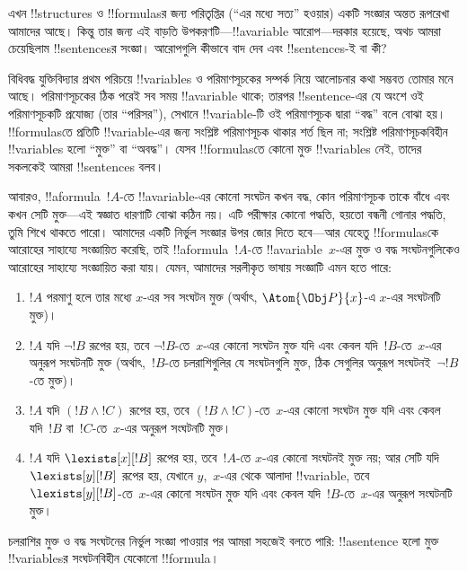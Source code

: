 \documentclass[../../../include/open-logic-section]{subfiles}
\begin{document}


এখন !!{structure}s ও !!{formula}sর জন্য পরিতৃপ্তির (“এর মধ্যে সত্য”
হওয়ার) একটি সংজ্ঞার অন্তত রূপরেখা আমাদের আছে। কিন্তু তার জন্য এই বাড়তি
উপকরণটি—!!a{variable} আরোপ—দরকার হয়েছে, অথচ আমরা চেয়েছিলাম
!!{sentence}sর সংজ্ঞা। আরোপগুলি কীভাবে বাদ দেব এবং !!{sentence}s-ই বা
কী?

বিধিবদ্ধ যুক্তিবিদ্যার প্রথম পরিচয়ে !!{variable}s ও পরিমাণসূচকের সম্পর্ক
নিয়ে আলোচনার কথা সম্ভবত তোমার মনে আছে। পরিমাণসূচকের ঠিক পরেই সব সময়
!!a{variable} থাকে; তারপর !!{sentence}-এর যে অংশে ওই পরিমাণসূচকটি প্রযোজ্য
(তার “পরিসর”), সেখানে !!{variable}-টি ওই পরিমাণসূচক দ্বারা “বদ্ধ” বলে
বোঝা হয়। !!{formula}sতে প্রতিটি !!{variable}-এর জন্য সংশ্লিষ্ট পরিমাণসূচক
থাকার শর্ত ছিল না; সংশ্লিষ্ট পরিমাণসূচকবিহীন !!{variable}s হলো “মুক্ত” বা
“অবদ্ধ”। যেসব !!{formula}sতে কোনো মুক্ত !!{variable}s নেই, তাদের সকলকেই
আমরা !!{sentence}s বলব।

আবারও, !!a{formula}~$!A$-তে !!a{variable}-এর কোনো সংঘটন কখন বদ্ধ, কোন
পরিমাণসূচক তাকে বাঁধে এবং কখন সেটি মুক্ত—এই স্বজ্ঞাত ধারণাটি বোঝা কঠিন
নয়। এটি পরীক্ষার কোনো পদ্ধতি, হয়তো বন্ধনী গোনার পদ্ধতি, তুমি শিখে
থাকতে পারো। আমাদের একটি নির্ভুল সংজ্ঞার উপর জোর দিতে হবে—আর যেহেতু
!!{formula}sকে আরোহের সাহায্যে সংজ্ঞায়িত করেছি, তাই !!a{formula}~$!A$-তে
!!a{variable}~$x$-এর মুক্ত ও বদ্ধ সংঘটনগুলিকেও আরোহের সাহায্যে সংজ্ঞায়িত
করা যায়। যেমন, আমাদের সরলীকৃত ভাষায় সংজ্ঞাটি এমন হতে পারে:
\begin{enumerate}
  \item $!A$ পরমাণু হলে তার মধ্যে $x$-এর সব সংঘটন মুক্ত (অর্থাৎ,
  $\Atom{\Obj P}{x}$-এ $x$-এর সংঘটনটি মুক্ত)।
  \item $!A$ যদি $\lnot !B$ রূপের হয়, তবে $\lnot !B$-তে~$x$-এর কোনো
  সংঘটন মুক্ত যদি এবং কেবল যদি~$!B$-তে~$x$-এর অনুরূপ সংঘটনটি মুক্ত
  (অর্থাৎ,~$!B$-তে চলরাশিগুলির যে সংঘটনগুলি মুক্ত, ঠিক সেগুলির অনুরূপ
  সংঘটনই~$\lnot !B$-তে মুক্ত)।
  \item $!A$ যদি $(!B \land !C)$ রূপের হয়, তবে $(!B \land !C)$-তে~$x$-এর
  কোনো সংঘটন মুক্ত যদি এবং কেবল যদি~$!B$ বা~$!C$-তে~$x$-এর অনুরূপ
  সংঘটনটি মুক্ত।
  \item $!A$ যদি $\lexists[x][!B]$ রূপের হয়, তবে~$!A$-তে $x$-এর কোনো
  সংঘটনই মুক্ত নয়; আর সেটি যদি $\lexists[y][!B]$ রূপের হয়, যেখানে
  $y$,~$x$-এর থেকে আলাদা !!{variable}, তবে $\lexists[y][!B]$-তে~$x$-এর
  কোনো সংঘটন মুক্ত যদি এবং কেবল যদি~$!B$-তে~$x$-এর অনুরূপ সংঘটনটি মুক্ত।
\end{enumerate}

চলরাশির মুক্ত ও বদ্ধ সংঘটনের নির্ভুল সংজ্ঞা পাওয়ার পর আমরা সহজেই বলতে
পারি: !!a{sentence} হলো মুক্ত !!{variable}sর সংঘটনবিহীন যেকোনো
!!{formula}।
\end{document}
